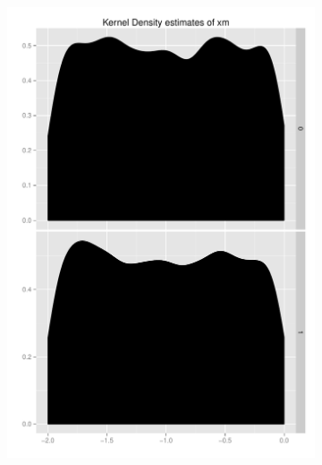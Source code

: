 \documentclass[11pt,letterpaper]{article}
\begin{document}
\begin{figure}[h]
    \begin{subfigure}[b]{0.3\textwidth}\centering \includegraphics[width=1\textwidth]{xm} \end{subfigure}

\end{figure}
\end{document}
